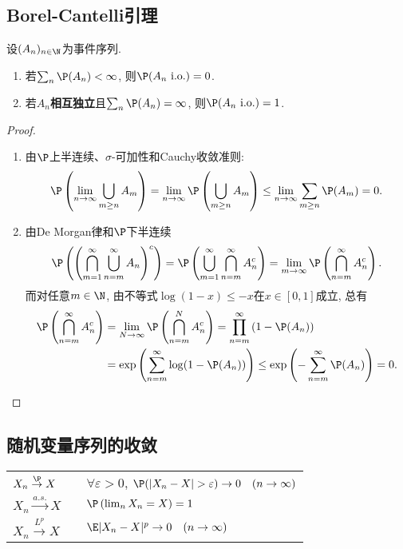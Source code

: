\documentclass[a4paper, 10pt]{ctexart}
\begin{document}
\subsection{Borel-Cantelli引理}

\begin{theorem}
	设$(A_n)_{n \in \N}$为事件序列.
	\begin{enumerate}
		\item 若$\sum_n \P(A_n) < \infty$, 则$\P(A_n \text{ i.o.} ) =0$. 
		\item 若$A_n$\textbf{相互独立}且$\sum_n \P(A_n) = \infty$, 则$\P(A_n \text{ i.o.} ) =1$.
	\end{enumerate}
\end{theorem}
\begin{proof}
	\begin{enumerate}
		\item 由$\P$上半连续、$\sigma$-可加性和Cauchy收敛准则: 
		\begin{equation*} 
			\P\left(\lim_{n \to \infty} \bigcup_{m \geq n} A_m\right) 
			= \lim_{n \to \infty} \P \left(\bigcup_{m \geq n} A_m\right) 
			\leq \lim_{n \to \infty} \sum_{m \geq n} \P(A_m) = 0. 
		\end{equation*}
		\item 由De Morgan律和$\P$下半连续
		\begin{equation*}
			\P \left( \left(\bigcap_{m=1}^{\infty} \bigcup_{n=m}^{\infty} A_n \right)^c \right)
			= \P \left( \bigcup_{m=1}^{\infty} \bigcap_{n=m}^{\infty} A_n^c \right) 
			= \lim_{m \to \infty} \P\left( \bigcap_{n=m}^{\infty} A_n^c \right).
		\end{equation*}
		而对任意$m \in \N$, 由不等式$\log(1-x) \leq -x$在$x \in [0,1]$成立, 总有
		\begin{align*}
			\P \left( \bigcap_{n=m}^{\infty} A_n^c \right) 
			&= \lim_{N \to \infty} \P \left( \bigcap_{n=m}^{N} A_n^c \right) 
			= \prod_{n=m}^{\infty} \left( 1 - \P(A_n) \right) \\
			&= \exp\left( \sum_{n=m}^{\infty} \log(1-\P(A_n)) \right)
			\leq \exp\left(- \sum_{n=m}^{\infty} \P(A_n) \right) 
			= 0. 
		\end{align*}
	\end{enumerate}
\end{proof}


\subsection{随机变量序列的收敛}
\begin{table}[H]
	\centering
	\begin{tabular}{lcl}
	\toprule
		$X_n \stackrel{\P}{\to} X$ &\quad & $\forall \varepsilon > 0$, $\P(|X_n - X| > \varepsilon) \to 0 \quad(n \to \infty)$ \\
		$X_n \stackrel{a.s.}{\to} X$ &\quad & $\P\left(\lim_n X_n = X\right) = 1$ \\
		$X_n \stackrel{L^p}{\to} X$ &\quad & $\E|X_n - X|^p \to 0 \quad (n \to \infty)$\\
	\bottomrule
	\end{tabular}
\end{table}
\end{document}
